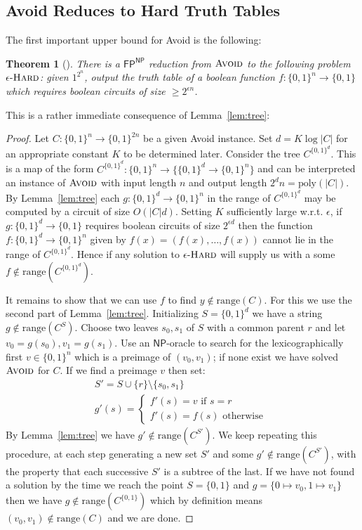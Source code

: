 \documentclass[11pt]{article}
\newtheorem{theorem}{Theorem}
\newcommand{\dash}{\text{-}}
\newcommand{\B}{\{0,1\}}
\newcommand{\rng}{\mathrm{range}}
\newcommand{\poly}{\mathrm{poly}}
\newcommand{\avoid}{\textsc{Avoid}}
\begin{document}
\subsection{Avoid Reduces to Hard Truth Tables}\label{sec:avoid-to-tt}
The first important upper bound for Avoid is the following:
\begin{theorem}[\cite{Korten1,Jerabek}]\label{thm:avoid-to-tt}
There is a $\mathsf{FP^{NP}}$ reduction from $\avoid$ to the following problem $\epsilon\dash\textsc{Hard}$: given $1^{2^n}$, output the truth table of a boolean function $f: \B^n \to \B$ which requires boolean circuits of size $\geq 2^{\epsilon n}$.
\end{theorem}
This is a rather immediate consequence of Lemma~\ref{lem:tree}:
\begin{proof}
Let $C: \B^n \to \B^{2n}$ be a given Avoid instance. Set $d = K\log |C|$ for an appropriate constant $K$ to be determined later. Consider the tree $C^{\B^d}$. This is a map of the form ${C^{\B^d}: \B^n \to \{\B^d \to \B^n\}}$ and can be interpreted an instance of $\avoid$ with input length $n$ and output length $2^dn = \poly(|C|)$. By Lemma~\ref{lem:tree} each $g: \B^d \to \B^n$ in the range of $C^{\B^d}$ may be computed by a circuit of size $O(|C|d)$. Setting $K$ sufficiently large w.r.t. $\epsilon$, if $g: \B^d \to \B$ requires boolean circuits of size $2^{\epsilon d}$ then the function $f: \B^d \to \B^n$ given by $f(x) = (f(x),\ldots,f(x))$ cannot lie in the range of $C^{\B^d}$.  Hence if any solution to $\epsilon\dash\textsc{Hard}$ will supply us with a some $f \notin \rng(C^{\B^d})$.

It remains to show that we can use $f$ to find $y \notin \rng(C)$. For this we use the second part of Lemma~\ref{lem:tree}. Initializing $S = \B^d$ we have a string $g \notin \rng(C^S)$. Choose two leaves $s_0,s_1$ of $S$ with a common parent $r$ and let $v_0=g(s_0), v_1=g(s_1)$. Use an $\mathsf{NP}$-oracle to search for the lexicographically first $v \in \B^n$ which is a preimage of $(v_0, v_1)$; if none exist we have solved $\avoid$ for $C$. If we find a preimage $v$ then set:
\begin{gather*}
S' = S \cup \{r\} \setminus \{s_0,s_1\}\\
g'(s) = \begin{cases}
		f'(s) = v \text{ if } s=r\\
		f'(s)= f(s) \text{ otherwise } 
\end{cases}
\end{gather*}
By Lemma~\ref{lem:tree} we have $g' \notin \rng(C^{S'})$. We keep repeating this procedure, at each step generating a new set $S'$ and some $g' \notin \rng(C^{S'})$, with the property that each successive $S'$ is a subtree of the last. If we have not found a solution by the time we reach the point $S = \{0,1\}$ and $g= \{0 \mapsto v_0, 1 \mapsto v_1\}$ then we have $g \notin \rng(C^{\{0,1\}})$ which by definition means $(v_0,v_1) \notin \rng(C)$ and we are done.
\end{proof}
\end{document}
